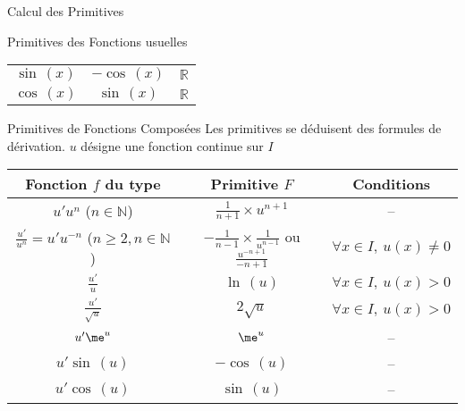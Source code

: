 \documentclass{cours}
\begin{document}
\begin{Gpartie}{Calcul des Primitives}
\begin{Spartie}{Primitives des Fonctions usuelles}
\begin{table}[H]
\begin{tabular}[c]{ @{}*{3}{C}@{} }
                    $\sin\,(x)$                                   & $-\cos\,(x)$                                                        & $\mathbb{R}$ \\ 
                    $\cos\,(x)$                                   & $\sin\,(x)$                                                         & $\mathbb{R}$ \\ \bottomrule
                \end{tabular}
            \end{table}
        \end{Spartie}
        \begin{Spartie}{Primitives de Fonctions Composées}
            Les primitives se déduisent des formules de dérivation. $u$ désigne une fonction continue sur $I$ 
            \begin{table}[H] \centering {}
                \begin{tabular}[c]{ @{}*{3}{C}@{} } \toprule
                    Fonction $f$ du type                                    & Primitive $F$                                                             & Conditions  \\ \midrule
                    $u'u^n$ ($n\in\mathbb{N}$)                              & $\frac{1}{n+1}\times u^{n+1}$                                             & \---\\
                    $\frac{u'}{u^n}=u'u^{-n}$ ($n\geq2, n\in\mathbb{N}$)   & $-\frac{1}{n-1}\times\frac{1}{u^{n-1}}$ ou $\frac{u^{-n+1}}{-n+1}$        & $\forall x\in I,~u(x)\neq0$ \\
                    $\frac{u'}{u}$                                          & $\ln\,(u)$                                                                  & $\forall x\in I,~u(x)>0$ \\
                    $\frac{u'}{\sqrt{u}}$                                   & $2\sqrt{u}$                                                               & $\forall x\in I,~u(x)>0$ \\
                    $u'\me^u$                                                 & $\me^u$                                                                     & \---\\
                    $u'\sin\,(u)$                                             & $-\cos\,(u)$                                                                & \---\\
                    $u'\cos\,(u)$                                             & $\sin\,(u)$                                                                 & \---\\ \bottomrule

\end{tabular}
\end{table}
\end{Spartie}
\end{Gpartie}
\end{document}
